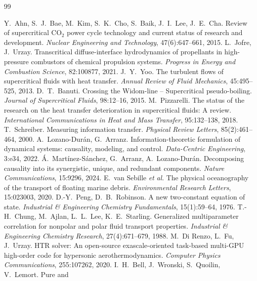 \documentclass[11pt]{article}
\begin{document}
\begin{thebibliography}{99}\small
{}
 Y.\ Ahn, S.\ J.\ Bae, M.\ Kim, S.\ K.\ Cho, S.\ Baik, J.\ I.\ Lee, J.\ E.\ Cha.
Review of supercritical CO$_2$ power cycle technology and current status of research and
development. \emph{Nuclear Engineering and Technology}, 47(6):647--661, 2015.
 L.\ Jofre, J.\ Urzay. Transcritical diffuse-interface hydrodynamics
of propellants in high-pressure combustors of chemical propulsion systems. \emph{Progress
in Energy and Combustion Science}, 82:100877, 2021.
 J.\ Y.\ Yoo. The turbulent flows of supercritical fluids with heat
transfer. \emph{Annual Review of Fluid Mechanics}, 45:495--525, 2013.
 D.\ T.\ Banuti. Crossing the Widom-line -- Supercritical pseudo-boiling.
\emph{Journal of Supercritical Fluids}, 98:12--16, 2015.
 M.\ Pizzarelli. The status of the research on the heat transfer
deterioration in supercritical fluids: A review. \emph{International Communications in
Heat and Mass Transfer}, 95:132--138, 2018.
 T.\ Schreiber. Measuring information transfer. \emph{Physical Review
Letters}, 85(2):461--464, 2000.
 A.\ Lozano-Dur\'an, G.\ Arranz. Information-theoretic
formulation of dynamical systems: causality, modeling, and control. \emph{Data-Centric
Engineering}, 3:e34, 2022.
 \'A.\ Mart\'inez-S\'anchez, G.\ Arranz, A.\ Lozano-Dur\'an.
Decomposing causality into its synergistic, unique, and redundant components. \emph{Nature
Communications}, 15:9296, 2024.
 E.\ van Sebille \emph{et al.} The physical oceanography of the
transport of floating marine debris. \emph{Environmental Research Letters}, 15:023003, 2020.
 D.-Y.\ Peng, D.\ B.\ Robinson. A new two-constant equation of
state. \emph{Industrial \& Engineering Chemistry Fundamentals}, 15(1):59--64, 1976.
 T.-H.\ Chung, M.\ Ajlan, L.\ L.\ Lee, K.\ E.\ Starling. Generalized
multiparameter correlation for nonpolar and polar fluid transport properties.
\emph{Industrial \& Engineering Chemistry Research}, 27(4):671--679, 1988.
 M.\ Di Renzo, L.\ Fu, J.\ Urzay. HTR solver: An open-source
exascale-oriented task-based multi-GPU high-order code for hypersonic aerothermodynamics.
\emph{Computer Physics Communications}, 255:107262, 2020.
 I.\ H.\ Bell, J.\ Wronski, S.\ Quoilin, V.\ Lemort. Pure and

\end{thebibliography}
\end{document}
